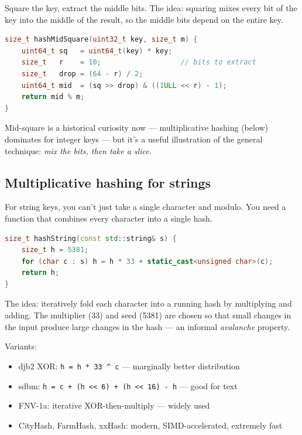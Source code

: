 \documentclass[11pt]{article}
\begin{document}
Square the key, extract the middle bits. The idea: squaring mixes
every bit of the key into the middle of the result, so the middle
bits depend on the entire key.

\begin{examplebox}
\begin{lstlisting}[language=C++,basicstyle=\ttfamily\small,frame=single]
size_t hashMidSquare(uint32_t key, size_t m) {
    uint64_t sq   = uint64_t(key) * key;
    size_t   r    = 10;                   // bits to extract
    size_t   drop = (64 - r) / 2;
    uint64_t mid  = (sq >> drop) & ((1ULL << r) - 1);
    return mid % m;
}
\end{lstlisting}
\end{examplebox}

Mid-square is a historical curiosity now --- multiplicative
hashing (below) dominates for integer keys --- but it's a useful
illustration of the general technique: \emph{mix the bits, then
take a slice.}

\subsection*{Multiplicative hashing for strings}

For string keys, you can't just take a single character and
modulo. You need a function that combines every character into a
single hash.

\begin{examplebox}
\begin{lstlisting}[language=C++,basicstyle=\ttfamily\small,frame=single]
size_t hashString(const std::string& s) {
    size_t h = 5381;
    for (char c : s) h = h * 33 + static_cast<unsigned char>(c);
    return h;
}
\end{lstlisting}
\end{examplebox}

The idea: iteratively fold each character into a running hash by
multiplying and adding. The multiplier (33) and seed (5381) are
chosen so that small changes in the input produce large changes
in the hash --- an informal \emph{avalanche} property.

Variants:
\begin{itemize}[leftmargin=*]
    \item djb2 XOR: \texttt{h = h * 33 \textasciicircum{} c} --- marginally better distribution
    \item sdbm: \texttt{h = c + (h << 6) + (h << 16) - h} --- good for text
    \item FNV-1a: iterative XOR-then-multiply --- widely used
    \item CityHash, FarmHash, xxHash: modern, SIMD-accelerated, extremely fast
\end{itemize}
\end{document}
